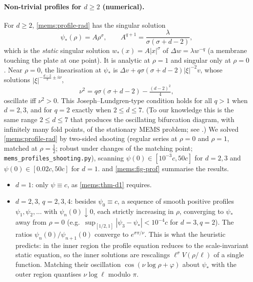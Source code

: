\paragraph{Non-trivial profiles for $d\ge2$ (numerical).}
For $d\ge2$, \eqref{mems:profile-rad} has the singular solution
\begin{equation}\label{mems:singular}
  \psi_*(\rho)=A\rho^{\sigma},\qquad A^{q+1}=\frac{\lambda}{\sigma(\sigma+d-2)},
\end{equation}
which is the \emph{static} singular solution $w_*(x)=A|x|^{\sigma}$ of
$\Delta w=\lambda w^{-q}$ (a membrane touching the plate at one point). It is
analytic at $\rho=1$ and singular only at $\rho=0$. Near $\rho=0$, the
linearisation at $\psi_*$ is $\Delta v+q\sigma(\sigma+d-2)|\xi|^{-2}v$, whose
solutions $|\xi|^{-\frac{d-2}2\pm i\nu}$,
\begin{equation}\label{mems:nu}
  \nu^2=q\sigma(\sigma+d-2)-\tfrac{(d-2)^2}4,
\end{equation}
oscillate iff $\nu^2>0$. This Joseph--Lundgren-type condition holds for all
$q>1$ when $d=2,3$, and for $q=2$ exactly when $2\le d\le7$. (To our knowledge this is the same
range $2\le d\le7$ that produces the oscillating bifurcation diagram, with
infinitely many fold points, of the stationary MEMS problem; see
\cite{EspositoGhoussoubGuo2010}.)
We solved \eqref{mems:profile-rad} by two-sided shooting (regular series at
$\rho=0$ and $\rho=1$, matched at $\rho=\frac12$; robust under changes of the
matching point; \texttt{mems\_profiles\_shooting.py}), scanning
$\psi(0)\in[10^{-3}c,50c]$ for $d=2,3$ and $\psi(0)\in[0.02c,50c]$ for $d=1$.
 and \cref{mems:fig-prof} summarise the results.
\begin{itemize}[nosep]
\item $d=1$: only $\psi\equiv c$, as \cref{mems:thm-d1} requires.
\item $d=2,3$, $q=2,3,4$: besides $\psi_0\equiv c$, a sequence of smooth
positive profiles $\psi_1,\psi_2,\dots$ with $\psi_n(0)\downarrow0$, each strictly
increasing in $\rho$, converging to $\psi_*$ away from $\rho=0$ (e.g.\
$\sup_{[1/2,1]}|\psi_3-\psi_*|<10^{-4}c$ for $d=3,q=2$). The ratios
$\psi_n(0)/\psi_{n+1}(0)$ converge to $e^{\sigma\pi/\nu}$. This is what the
heuristic predicts: in the inner region the profile equation reduces to the
scale-invariant static equation, so the inner solutions are rescalings
$\ell^{\sigma}V(\rho/\ell)$ of a single function. Matching their oscillation
$\cos(\nu\log\rho+\varphi)$ about $\psi_*$ with the outer region quantises
$\nu\log\ell$ modulo $\pi$.
\end{itemize}

